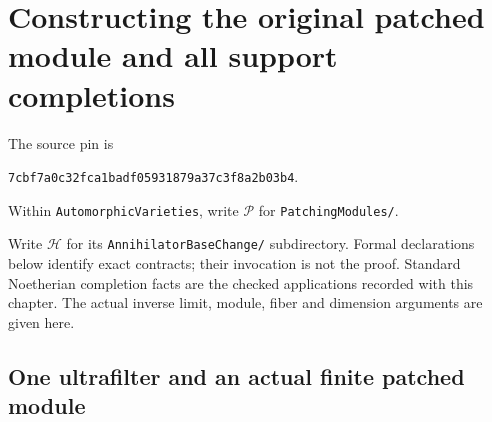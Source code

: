 \section{Constructing the original patched module and all support completions}
\label{sec:patched-support-v040}


The source pin is
\par\smallskip\noindent
\texttt{7cbf7a0c32fca1badf05931879a37c3f8a2b03b4}.
\par\smallskip\noindent
Within \texttt{AutomorphicVarieties}, write $\mathcal P$ for
\texttt{PatchingModules/}.
\par\noindent
Write $\mathcal H$ for its \texttt{AnnihilatorBaseChange/}
subdirectory.  Formal declarations below
identify exact contracts; their invocation is not the proof.  Standard
Noetherian completion facts are the checked applications recorded with
this chapter.  The actual inverse limit, module, fiber and dimension
arguments are given here.

\subsection{One ultrafilter and an actual finite patched module}

